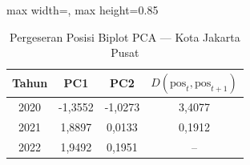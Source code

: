 \begin{table}[H]
\centering
\caption{Pergeseran Posisi Biplot PCA --- Kota Jakarta Pusat} \label{tab:samplejarak_pca_skor_kota_jakarta_pusat}
\begin{adjustbox}{max width=\textwidth, max height=0.85\textheight}
\begin{tabular}{|c|c|c|c|}
\hline
\textbf{Tahun} & \textbf{PC1} & \textbf{PC2} & \textbf{$D(\text{pos}_t, \text{pos}_{t+1})$} \\
\hline
2020 & -1,3552 & -1,0273 & 3,4077 \\
2021 & 1,8897 & 0,0133 & 0,1912 \\
2022 & 1,9492 & 0,1951 & -- \\
\hline
\end{tabular}
\end{adjustbox}
\end{table}